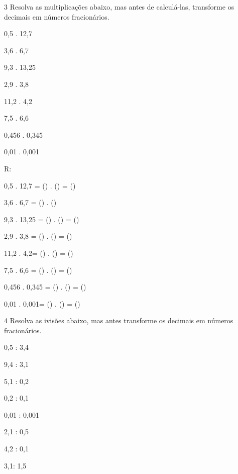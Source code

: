 \num{3} Resolva as multiplicações abaixo, mas antes de calculá-las,
transforme os decimais em números fracionários.
\item 0,5 . 12,7
\item 3,6 . 6,7
\item 9,3 . 13,25
\item 2,9 . 3,8
\item 11,2 . 4,2
\item 7,5 . 6,6
\item 0,456 . 0,345
\item 0,01 . 0,001

R:
\item 0,5 . 12,7 = () . () =
()
\item 3,6 . 6,7 = () . ()
\item 9,3 . 13,25 = () . () =
()
\item 2,9 . 3,8 = () . () =
()
\item 11,2 . 4,2= () . () =
()
\item 7,5 . 6,6 = () . () =
()
\item 0,456 . 0,345 = () . () =
()
\item 0,01 . 0,001= () . () =
()

\num{4} Resolva as ivisões abaixo, mas antes transforme os decimais em
números fracionários.
\item 0,5 : 3,4
\item 9,4 : 3,1
\item 5,1 : 0,2
\item 0,2 : 0,1
\item 0,01 : 0,001
\item 2,1 : 0,5
\item 4,2 : 0,1
\item 3,1: 1,5

